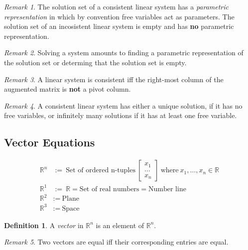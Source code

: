 \documentclass{article}
\theoremstyle{definition}
\newtheorem{definition}{Definition}[section]
\theoremstyle{remark}
\newtheorem*{remark}{Remark}
\theoremstyle{remark}
\theoremstyle{remark}
\newtheorem*{it follows}{It follows}
\begin{document}
\begin{remark}
  The solution set of a consistent linear system has a \textit{parametric representation} in which by convention free variables act as parameters. The solution set of an incosistent linear system is empty and has \textbf{no} parametric representation.
\end{remark}

\begin{remark}
  Solving a system amounts to finding a parametric representation of the solution set or determing that the solution set is empty.
\end{remark}

\begin{remark}
  A linear system is consistent iff the right-most column of the augmented matrix is \textbf{not} a pivot column.
\end{remark}

\begin{remark}
  A consistent linear system has either a unique solution, if it has no free variables, or infinitely many solutions if it has at least one free variable.
\end{remark}

\subsection{Vector Equations}

\begin{align*}
  \mathbb{R}^n &:=\ \text{Set of ordered n-tuples}\
  \begin{bmatrix}
    x_1 \\
    \dots  \\
    x_n
  \end{bmatrix}\
  \text{where}\ x_1, \dots, x_n \in \mathbb{R} \\
  \mathbb{R}^1 &:=\ \mathbb{R} = \text{Set of real numbers} =\text{Number line} \\
  \mathbb{R}^2 &:=\ \text{Plane} \\
  \mathbb{R}^3 &:=\ \text{Space}
\end{align*}



\begin{definition}
  A \textit{vector} in $\mathbb{R}^n$ is an element of $\mathbb{R}^n$.
\end{definition}

\begin{remark}
  Two vectors are equal iff their corresponding entries are equal.
\end{remark}
\end{document}
